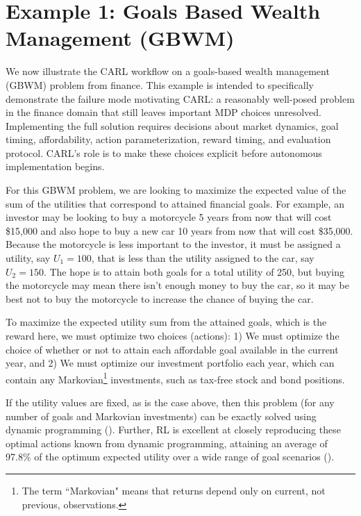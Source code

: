 \documentclass[mnsc,sglanonrev]{informs4}
\begin{document}
\section{Example 1: Goals Based Wealth Management (GBWM)}
\label{sec:example_gbwm}

We now illustrate the CARL workflow on a goals-based wealth management (GBWM) problem from finance. This example is intended to specifically demonstrate the failure mode motivating CARL: a reasonably well-posed problem in the finance domain that still leaves important MDP choices unresolved. Implementing the full solution requires decisions about market dynamics, goal timing, affordability, action parameterization, reward timing, and evaluation protocol. CARL's role is to make these choices explicit before autonomous implementation begins. 

For this GBWM problem, we are looking to maximize the expected value of the sum of the utilities that correspond to attained financial goals. For example, an investor may be looking to buy a motorcycle 5 years from now that will cost \$15,000 and also hope to buy a new car 10 years from now that will cost \$35,000. Because the motorcycle is less important to the investor, it must be assigned a utility, say $U_1=100$, that is less than the utility assigned to the car, say $U_2=150$. The hope is to attain both goals for a total utility of 250, but buying the motorcycle may mean there isn't enough money to buy the car, so it may be best not to buy the motorcycle to increase the chance of buying the car. 

To maximize the expected utility sum from the attained goals, which is the reward here, we must optimize two choices (actions): 1) We must optimize the choice of whether or not to attain each affordable goal available in the current year, and 2) We must optimize our investment portfolio each year, which can contain any Markovian\footnote{The term ``Markovian" means that returns depend only on current, not previous, observations.} investments, such as tax-free stock and bond positions. 

If the utility values are fixed, as is the case above, then this problem (for any number of goals and Markovian investments) can be exactly solved using dynamic programming (\cite{das_dynamic_2022}). Further, RL is excellent at closely reproducing these optimal actions known from dynamic programming, attaining an average of 97.8\% of the optimum expected utility over a wide range of goal scenarios (\cite{das_meta_2026}).
\end{document}
